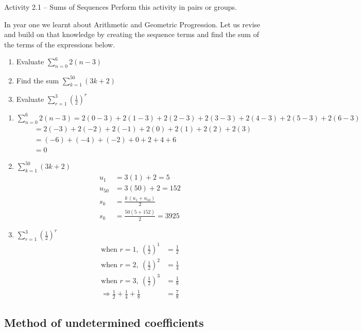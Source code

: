 \begin{activity}{Activity 2.1 -- Sums of Sequences}
Perform this activity in pairs or groups.

In year one we learnt about Arithmetic and Geometric Progression. Let us
revise and build on that knowledge by creating the sequence terms and find
the sum of the terms of the expressions below.
\begin{enumerate}
  \item Evaluate $\sum_{n=0}^{6} 2(n-3)$
  \item Find the sum $\sum_{k=1}^{50} (3k+2)$
  \item Evaluate $\sum_{r=1}^{3} \left(\frac{1}{2}\right)^r$
\end{enumerate}

\solution
\begin{enumerate}
  \item $\sum_{n=0}^{6} 2(n-3) = 2(0-3) + 2(1-3) + 2(2-3) + 2(3-3) + 2(4-3) + 2(5-3) + 2(6-3)$
  \begin{align*}
    &= 2(-3) + 2(-2) + 2(-1) + 2(0) + 2(1) + 2(2) + 2(3) \\
    &= (-6) + (-4) + (-2) + 0 + 2 + 4 + 6 \\
    &= 0
  \end{align*}
  \item $\sum_{k=1}^{50} (3k+2)$
  \begin{align*}
    u_1 &= 3(1) + 2 = 5 \\
    u_{50} &= 3(50) + 2 = 152 \\
    s_k &= \frac{k\,(u_1 + u_{50})}{2} \\
    s_k &= \frac{50(5+152)}{2} = 3925
  \end{align*}
  \item $\sum_{r=1}^{3} \left(\frac{1}{2}\right)^r$
  \begin{align*}
    \text{when } r = 1,\ \left(\tfrac{1}{2}\right)^1 &= \tfrac{1}{2} \\
    \text{when } r = 2,\ \left(\tfrac{1}{2}\right)^2 &= \tfrac{1}{4} \\
    \text{when } r = 3,\ \left(\tfrac{1}{2}\right)^3 &= \tfrac{1}{8} \\
    \Longrightarrow \tfrac{1}{2} + \tfrac{1}{4} + \tfrac{1}{8} &= \tfrac{7}{8}
  \end{align*}
\end{enumerate}
\end{activity}

\subsection{Method of undetermined coefficients}

